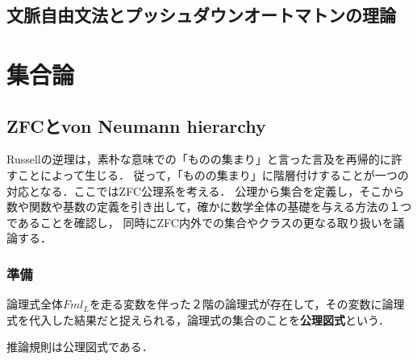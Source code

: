\documentclass[uplatex, dvipdfmx]{jsreport}
\begin{document}
\chapter{文脈自由文法とプッシュダウンオートマトンの理論}


\part{集合論}

\chapter{ZFCとvon Neumann hierarchy}

Russellの逆理は，素朴な意味での「ものの集まり」と言った言及を再帰的に許すことによって生じる．
従って，「ものの集まり」に階層付けすることが一つの対応となる．ここではZFC公理系を考える．
公理から集合を定義し，そこから数や関数や基数の定義を引き出して，確かに数学全体の基礎を与える方法の１つであることを確認し，
同時にZFC内外での集合やクラスの更なる取り扱いを議論する．

\section{準備}

\begin{definition}
    論理式全体$Fml_L$を走る変数を伴った２階の論理式が存在して，その変数に論理式を代入した結果だと捉えられる，論理式の集合のことを\textbf{公理図式}という．
\end{definition}
\begin{example}
    推論規則は公理図式である．
\end{example}
\end{document}
